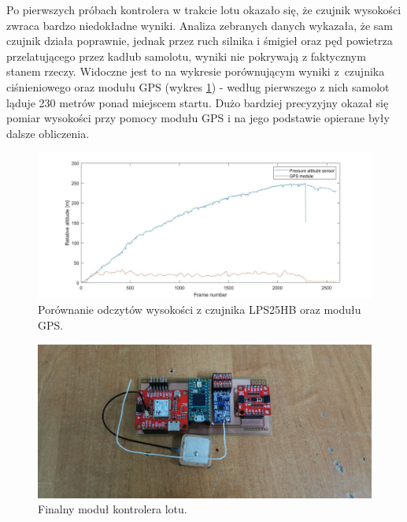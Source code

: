 \documentclass[12pt, a4paper]{article}
\begin{document}
Po pierwszych próbach kontrolera w trakcie lotu okazało się, że czujnik wysokości zwraca bardzo niedokładne wyniki. Analiza zebranych danych wykazała, że sam czujnik działa poprawnie, jednak przez ruch silnika i śmigieł oraz pęd powietrza przelatującego przez kadłub samolotu, wyniki nie pokrywają z faktycznym stanem rzeczy. Widoczne jest to na wykresie porównującym wyniki z~czujnika ciśnieniowego oraz modułu GPS (wykres \ref{fig:alti}) - według pierwszego z nich samolot ląduje 230 metrów ponad miejscem startu. Dużo bardziej precyzyjny okazał się pomiar wysokości przy pomocy modułu GPS i na jego podstawie opierane były dalsze obliczenia.

\begin{figure}[ht]
    \centering
    \includegraphics[width=1\textwidth]{alti}
    \caption{Porównanie odczytów wysokości z czujnika LPS25HB oraz modułu GPS.}
    \label{fig:alti}
\end{figure}

   \begin{figure}[ht]
    \centering
    \includegraphics[width=1\textwidth]{dodokontroler}
    \caption{Finalny moduł kontrolera lotu.}
    \label{fig:dodokontroler}
\end{figure}
\end{document}
